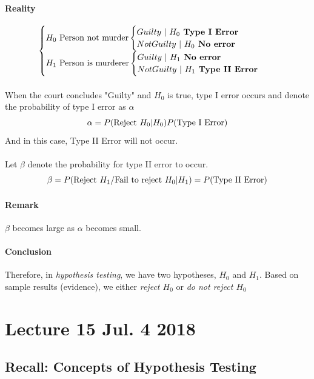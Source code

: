 \documentclass{article}
\begin{document}
		\paragraph{Reality}
			\[
				\begin{cases}
					H_0 \text{{ Person not murder}}
						\begin{cases}
							Guilty\ \vert \ H_0\textbf{ Type I Error}\\
							NotGuilty\ \vert \ H_0 \textbf{ No error}
						\end{cases} \\
					H_1 \text{{ Person is murderer}}
						\begin{cases}
							Guilty\ \vert \ H_1 \textbf{ No error}\\
							NotGuilty\ \vert \ H_1 \textbf{ Type II Error}\\
						\end{cases}
				\end{cases}
			\]
		\paragraph{}When the court concludes "Guilty" and $H_0$ is true, type I error occurs and denote the probability of type I error as $\alpha$
			\[
				\alpha = P(\text{{Reject $H_0$}} \vert H_0) P(\text{{Type I Error}})
			\]
			And in this case, Type II Error will not occur.
		\paragraph{}Let $\beta$ denote the probability for type II error to occur.
			\[
				\beta = P(\text{{Reject $H_1$/Fail to reject $H_0$}} \vert H_1) = P(\text{{Type II Error}})
			\]
		\paragraph{Remark} $\beta$ becomes large as $\alpha$ becomes small. 
		\paragraph{Conclusion} Therefore, in \emph{hypothesis testing}, we have two hypotheses, $H_0$ and $H_1$. Based on sample results (evidence), we either \emph{reject $H_0$} or \emph{do not reject $H_0$}
		
	\section{Lecture 15 Jul. 4 2018}
		\subsection{Recall: Concepts of Hypothesis Testing}
\end{document}
